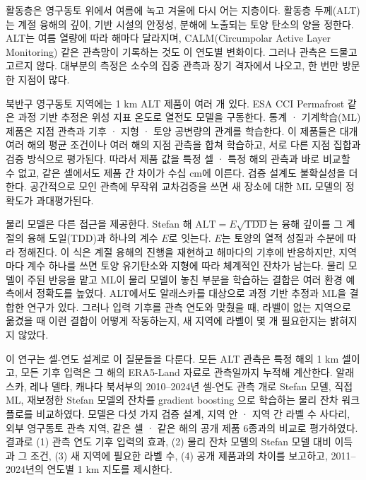 활동층은 영구동토 위에서 여름에 녹고 겨울에 다시 어는 지층이다. 활동층 두께(ALT)는 계절 융해의 깊이, 기반 시설의 안정성, 분해에 노출되는 토양 탄소의 양을 정한다\cite{Hjort2018,Schuur2015,Biskaborn2019}. ALT는 여름 열량에 따라 해마다 달라지며, CALM(Circumpolar Active Layer Monitoring) 같은 관측망이 기록하는 것도 이 연도별 변화이다\cite{Nelson1997,Streletskiy2025}. 그러나 관측은 드물고 고르지 않다. 대부분의 측정은 소수의 집중 관측과 장기 격자에서 나오고, 한 번만 방문한 지점이 많다\cite{Moore2025,Veremeeva2025}.

북반구 영구동토 지역에는 1 km ALT 제품이 여러 개 있다. ESA CCI Permafrost 같은 과정 기반 추정은 위성 지표 온도로 열전도 모델을 구동한다\cite{Westermann2024,Westermann2025}. 통계 · 기계학습(ML) 제품은 지점 관측과 기후 · 지형 · 토양 공변량의 관계를 학습한다\cite{Aalto2018,Ran2022a,Liu2024,Wei2026}. 이 제품들은 대개 여러 해의 평균 조건이나 여러 해의 지점 관측을 합쳐 학습하고, 서로 다른 지점 집합과 검증 방식으로 평가된다. 따라서 제품 값을 특정 셀 · 특정 해의 관측과 바로 비교할 수 없고, 같은 셀에서도 제품 간 차이가 수십 cm에 이른다. 검증 설계도 불확실성을 더한다. 공간적으로 모인 관측에 무작위 교차검증을 쓰면 새 장소에 대한 ML 모델의 정확도가 과대평가된다\cite{Roberts2017,Ploton2020,MeyerPebesma2022,Wadoux2021}.

물리 모델은 다른 접근을 제공한다. Stefan 해 $\mathrm{ALT}=E\sqrt{\mathrm{TDD}}$는 융해 깊이를 그 계절의 융해 도일(TDD)과 하나의 계수 $E$로 잇는다. $E$는 토양의 열적 성질과 수분에 따라 정해진다\cite{Stefan1891,Riseborough2008}. 이 식은 계절 융해의 진행을 재현하고 해마다의 기후에 반응하지만, 지역마다 계수 하나를 쓰면 토양 유기탄소와 지형에 따라 체계적인 잔차가 남는다. 물리 모델이 주된 반응을 맡고 ML이 물리 모델이 놓친 부분을 학습하는 결합은 여러 환경 예측에서 정확도를 높였다\cite{Willard2022}. ALT에서도 알래스카를 대상으로 과정 기반 추정과 ML을 결합한 연구가 있다\cite{Gautam2025}. 그러나 입력 기후를 관측 연도와 맞췄을 때, 라벨이 없는 지역으로 옮겼을 때 이런 결합이 어떻게 작동하는지, 새 지역에 라벨이 몇 개 필요한지는 밝혀지지 않았다.

이 연구는 셀-연도 설계로 이 질문들을 다룬다. 모든 ALT 관측은 특정 해의 1 km 셀이고, 모든 기후 입력은 그 해의 ERA5-Land 자료로 관측일까지 누적해 계산한다\cite{munozsabater2021_era5_land}. 알래스카, 레나 델타, 캐나다 북서부의 2010--2024년 셀-연도 관측 \nncyAll{}개로 Stefan 모델, 직접 ML, 재보정한 Stefan 모델의 잔차를 gradient boosting 으로 학습하는 물리 잔차 워크플로를 비교하였다. 모델은 다섯 가지 검증 설계, 지역 안 · 지역 간 라벨 수 사다리, 외부 영구동토 관측 지역, 같은 셀 · 같은 해의 공개 제품 6종과의 비교로 평가하였다. 결과로 (1) 관측 연도 기후 입력의 효과, (2) 물리 잔차 모델의 Stefan 모델 대비 이득과 그 조건, (3) 새 지역에 필요한 라벨 수, (4) 공개 제품과의 차이를 보고하고, 2011--2024년의 연도별 1 km 지도를 제시한다.
